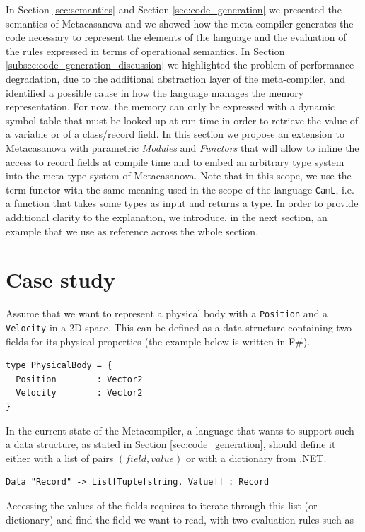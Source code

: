 In Section \ref{sec:semantics} and Section \ref{sec:code_generation} we presented the semantics of Metacasanova and we showed how the meta-compiler generates the code necessary to represent the elements of the language and the evaluation of the rules expressed in terms of operational semantics. In Section \ref{subsec:code_generation_discussion} we highlighted the problem of performance degradation, due to the additional abstraction layer of the meta-compiler, and identified a possible cause in how the language manages the memory representation. For now, the memory can only be expressed with a dynamic symbol table that must be looked up at run-time in order to retrieve the value of a variable or of a class/record field. In this section we propose an extension to Metacasanova with parametric \textit{Modules} and \textit{Functors} that will allow to inline the access to record fields at compile time and to embed an arbitrary type system into the meta-type system of Metacasanova. Note that in this scope, we use the term functor with the same meaning used in the scope of the language \texttt{CamL}, i.e. a function that takes some types as input and returns a type. In order to provide additional clarity to the explanation, we introduce, in the next section, an example that we use as reference across the whole section.

\section{Case study}
Assume that we want to represent a physical body with a \texttt{Position} and a \texttt{Velocity} in a 2D space. This can be defined as a data structure containing two fields for its physical properties (the example below is written in F\#). 

\begin{lstlisting}
type PhysicalBody = {
  Position        : Vector2
  Velocity        : Vector2
}
\end{lstlisting}

In the current state of the Metacompiler, a language that wants to support such a data structure, as stated in Section \ref{sec:code_generation}, should define it either with a list of pairs $(field,value)$ or with a dictionary from .NET.

\begin{lstlisting}
Data "Record" -> List[Tuple[string, Value]] : Record
\end{lstlisting} 

Accessing the values of the fields requires to iterate through this list (or dictionary) and find the field we want to read, with two evaluation rules such as

